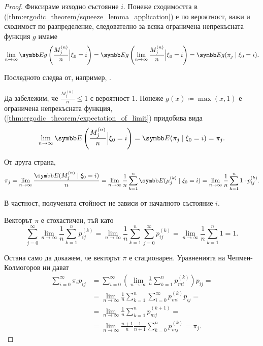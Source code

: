 \documentclass[numbers=endperiod, bibliography=totocnumbered]{scrartcl}
\begin{document}
\begin{proof}
  Фиксираме изходно състояние \( i \). Понеже сходимостта в (\ref{thm:ergodic_theorem/squeeze_lemma_application}) е по вероятност, важи и сходимост по разпределение, следователно за всяка ограничена непрекъсната функция \( g \) имаме
  \begin{equation}\label{thm:ergodic_theorem/expectation_of_limit}
    \lim_{n \to \infty} \Expect g\left( \frac {M^{(n)}_j} n \Bigl\vert \xi_0 = i \right) = \Expect g\left( \lim_{n \to \infty} \frac {M^{(n)}_j} n \Bigl\vert \xi_0 = i \right) = \Expect g(\pi_j \mid \xi_0 = i).
  \end{equation}

  Последното следва от, например, \cite[следствие 2 на стр. 119]{Borovkov}.

  Да забележим, че \( \frac {M^{(n)}_j} n \leq 1 \) с вероятност \( 1 \). Понеже \( g(x) \coloneqq \max(x, 1) \) е ограничена непрекъсната функция, (\ref{thm:ergodic_theorem/expectation_of_limit}) придобива вида
  \begin{equation*}
    \lim_{n \to \infty} \Expect \left( \frac {M^{(n)}_j} n \Bigl\vert \xi_0 = i \right) = \Expect (\pi_j \mid \xi_0 = i) = \pi_j.
  \end{equation*}

  От друга страна,
  \begin{equation*}
    \pi_j
    =
    \lim_{n \to \infty} \frac {\Expect(M^{(n)}_j \mid \xi_0 = i)} n
    =
    \lim_{n \to \infty} \frac 1 n \sum_{k=1}^n \Expect(\mu^{(k)}_j \mid \xi_0 = i)
    =
    \lim_{n \to \infty} \frac 1 n \sum_{k=1}^n 1 \cdot p_{ij}^{(k)}.
  \end{equation*}

  В частност, получената стойност не зависи от началното състояние \( i \).

  Векторът \( \pi \) е стохастичен, тъй като
  \begin{equation*}
    \sum_{j=0}^\infty \lim_{n \to \infty} \frac 1 n \sum_{k=1}^n p_{ij}^{(k)}
    =
    \lim_{n \to \infty} \frac 1 n \sum_{k=1}^n \sum_{j=0}^\infty p_{ij}^{(k)}
    =
    \lim_{n \to \infty} \frac 1 n \sum_{k=1}^n 1
    =
    1.
  \end{equation*}

  Остана само да докажем, че векторът \( \pi \) е стационарен. Уравненията на Чепмен-Колмогоров ни дават
  \begin{align*}
    \sum_{i=0}^\infty \pi_i p_{ij}
    &=
    \sum_{i=0}^\infty \left( \lim_{n \to \infty} \frac 1 n \sum_{k=1}^n p_{mi}^{(k)} \right) p_{ij}
    = \\ &=
    \lim_{n \to \infty} \frac 1 n \sum_{k=1}^n \sum_{i=0}^\infty p_{mi}^{(k)} p_{ij}
    = \\ &=
    \lim_{n \to \infty} \frac 1 n \sum_{k=1}^n p_{mj}^{(k+1)}
    = \\ &=
    \lim_{n \to \infty} \frac {n+1} n \frac 1 {n+1} \sum_{k=0}^n p_{mj}^{(k)}
    =
    \pi_j.
  \end{align*}
\end{proof}
\end{document}
